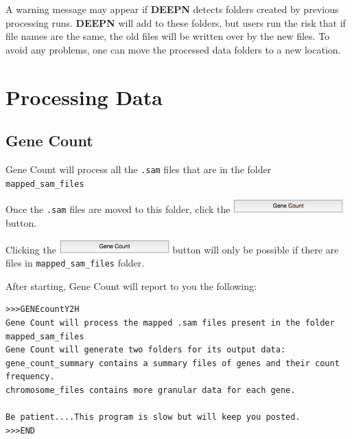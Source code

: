 \documentclass[11pt,fleqn]{book} %
\newcommand{\GeneCount}{{\color{Red} Gene Count }}
\newcommand{\DEEPN}{\textbf{DEEPN }}
\begin{document}
\begin{remark}
A warning message may appear if \DEEPN detects folders created by previous processing runs. \DEEPN will add to these folders, but users run the risk that if file names are the same, the old files will be written over by the new files. To avoid any problems, one can move the processed data folders to a new location.
\end{remark}


\part{Processing Data}



\chapter{\GeneCount}

\GeneCount will process all the \texttt{.sam} files that are in the folder \texttt{mapped\_sam\_files}

\vspace{15pt}

Once the \texttt{.sam} files are moved to this folder, click the \includegraphics[width=120pt]{Pictures/gene_count_btn} button.

\begin{remark}
Clicking the \includegraphics[width=120pt]{Pictures/gene_count_btn} button will only be possible if there are files in \texttt{mapped\_sam\_files} folder.
\end{remark}

After starting, \GeneCount will report to you the following:

\begin{lstlisting}
>>>GENEcountY2H
Gene Count will process the mapped .sam files present in the folder mapped_sam_files
Gene Count will generate two folders for its output data:
gene_count_summary contains a summary files of genes and their count frequency. 
chromosome_files contains more granular data for each gene.

Be patient....This program is slow but will keep you posted.
>>>END
\end{lstlisting}
\end{document}

